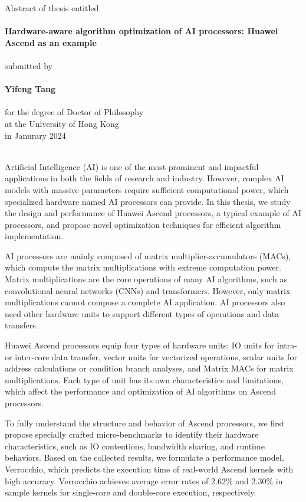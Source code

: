 \centering
Abstract of thesis entitled\\
~\\
{\Large \bf 
    Hardware-aware algorithm optimization of AI processors: Huawei Ascend as an example
}\\
~\\
submitted by\\
~\\
{\Large \bf Yifeng Tang}\\
~\\
for the degree of Doctor of Philosophy\\
at the University of Hong Kong\\
in Janurary 2024\\
~\\
\justifying

Artificial Intelligence (AI) is one of the most prominent and impactful applications in both the fields of research and industry. However, complex AI models with massive parameters require sufficient computational power, which specialized hardware named AI processors can provide. In this thesis, we study the design and performance of Huawei Ascend processors, a typical example of AI processors, and propose novel optimization techniques for efficient algorithm implementation.

AI processors are mainly composed of matrix multiplier-accumulators (MACs), which compute the matrix multiplications with extreme computation power. Matrix multiplications are the core operations of many AI algorithms, such as convolutional neural networks (CNNs) and transformers. However, only matrix multiplications cannot compose a complete AI application. AI processors also need other hardware units to support different types of operations and data transfers.

Huawei Ascend processors equip four types of hardware units: IO units for intra- or inter-core data transfer, vector units for vectorized operations, scalar units for address calculations or condition branch analyses, and Matrix MACs for matrix multiplications. Each type of unit has its own characteristics and limitations, which affect the performance and optimization of AI algorithms on Ascend processors.

To fully understand the structure and behavior of Ascend processors, we first propose specially crafted micro-benchmarks to identify their hardware characteristics, such as IO contentions, bandwidth sharing, and runtime behaviors. Based on the collected results, we formulate a performance model, Verrocchio, which predicts the execution time of real-world Ascend kernels with high accuracy. Verrocchio achieves average error rates of 2.62$\%$ and 2.30$\%$ in sample kernels for single-core and double-core execution, respectively.

